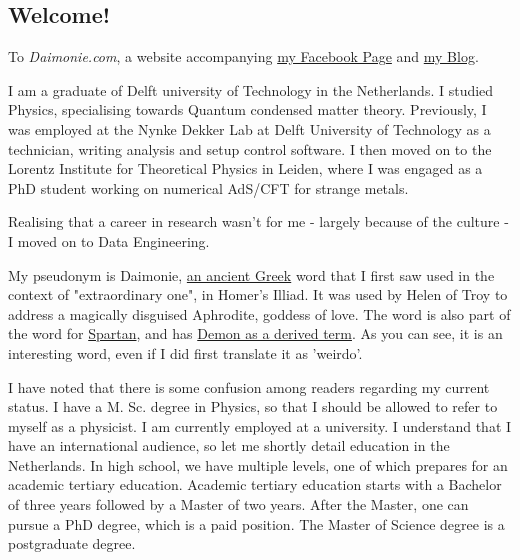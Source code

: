 

\begin{multicols}{2}

\section{Welcome!} 


To \emph{Daimonie.com}, a website accompanying \href{https://www.facebook.com/daimonie}{my Facebook Page} and \href{./blog"}{my Blog}.

I am a graduate of Delft university of Technology in the Netherlands. I studied Physics, specialising towards Quantum condensed matter theory. Previously, I was employed at the Nynke Dekker Lab at Delft University of Technology as a technician, writing analysis and setup control software. I then moved on to the Lorentz Institute for Theoretical Physics in Leiden, where I was engaged as a PhD student working on numerical AdS/CFT for strange metals. 

Realising that a career in research wasn't for me - largely because of the culture - I moved on to Data Engineering.

My pseudonym is Daimonie, \href{https://goo.gl/xwLXc1}{an ancient Greek} word that I first saw used in  the context of "extraordinary one", in Homer's Illiad.  It was used by Helen of Troy to address a magically disguised Aphrodite, goddess of love. The word is also part of the word for \href{https://goo.gl/kktWCr}{Spartan}, and has \href{https://goo.gl/sKxvMo}{Demon as a derived term}. As you can see, it is an interesting word, even if I did first translate it as 'weirdo'.

I have noted that there is some confusion among readers regarding my current status. I have a M. Sc. degree in Physics, so that I should be allowed to refer to myself as a physicist. I am currently employed at a university. I understand that I have an international audience, so let me shortly detail education in the Netherlands. In high school, we have multiple levels, one of which prepares for an academic tertiary education. Academic tertiary education starts with a Bachelor of three years followed by a Master of two years. After the Master, one can pursue a PhD degree, which is a paid position. The Master of Science degree is a postgraduate degree.



\end{multicols}
